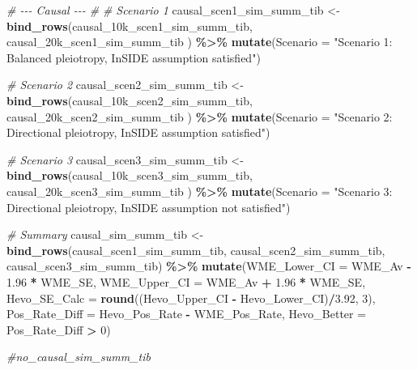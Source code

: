 \documentclass[
]{article}
\newenvironment{Shaded}{\begin{snugshade}}{\end{snugshade}}
\newcommand{\AttributeTok}[1]{\textcolor[rgb]{0.13,0.29,0.53}{#1}}
\newcommand{\CommentTok}[1]{\textcolor[rgb]{0.56,0.35,0.01}{\textit{#1}}}
\newcommand{\DecValTok}[1]{\textcolor[rgb]{0.00,0.00,0.81}{#1}}
\newcommand{\FloatTok}[1]{\textcolor[rgb]{0.00,0.00,0.81}{#1}}
\newcommand{\FunctionTok}[1]{\textcolor[rgb]{0.13,0.29,0.53}{\textbf{#1}}}
\newcommand{\NormalTok}[1]{#1}
\newcommand{\OtherTok}[1]{\textcolor[rgb]{0.56,0.35,0.01}{#1}}
\newcommand{\SpecialCharTok}[1]{\textcolor[rgb]{0.81,0.36,0.00}{\textbf{#1}}}
\newcommand{\StringTok}[1]{\textcolor[rgb]{0.31,0.60,0.02}{#1}}
\begin{document}
\begin{Shaded}
\begin{Highlighting}[]
\CommentTok{\# {-}{-}{-} Causal {-}{-}{-} \#}
\CommentTok{\# Scenario 1}
\NormalTok{causal\_scen1\_sim\_summ\_tib }\OtherTok{\textless{}{-}} \FunctionTok{bind\_rows}\NormalTok{(causal\_10k\_scen1\_sim\_summ\_tib,}
\NormalTok{                                       causal\_20k\_scen1\_sim\_summ\_tib}
\NormalTok{) }\SpecialCharTok{\%\textgreater{}\%} 
  \FunctionTok{mutate}\NormalTok{(}\AttributeTok{Scenario =} \StringTok{"Scenario 1: Balanced pleiotropy, InSIDE assumption satisfied"}\NormalTok{)}

\CommentTok{\# Scenario 2}
\NormalTok{causal\_scen2\_sim\_summ\_tib }\OtherTok{\textless{}{-}} \FunctionTok{bind\_rows}\NormalTok{(causal\_10k\_scen2\_sim\_summ\_tib,}
\NormalTok{                                       causal\_20k\_scen2\_sim\_summ\_tib}
\NormalTok{) }\SpecialCharTok{\%\textgreater{}\%} 
  \FunctionTok{mutate}\NormalTok{(}\AttributeTok{Scenario =} \StringTok{"Scenario 2: Directional pleiotropy, InSIDE assumption satisfied"}\NormalTok{)}

\CommentTok{\# Scenario 3}
\NormalTok{causal\_scen3\_sim\_summ\_tib }\OtherTok{\textless{}{-}} \FunctionTok{bind\_rows}\NormalTok{(causal\_10k\_scen3\_sim\_summ\_tib,}
\NormalTok{                                       causal\_20k\_scen3\_sim\_summ\_tib}
\NormalTok{) }\SpecialCharTok{\%\textgreater{}\%} 
  \FunctionTok{mutate}\NormalTok{(}\AttributeTok{Scenario =} \StringTok{"Scenario 3: Directional pleiotropy, InSIDE assumption not satisfied"}\NormalTok{)}


\CommentTok{\# Summary}
\NormalTok{causal\_sim\_summ\_tib }\OtherTok{\textless{}{-}} \FunctionTok{bind\_rows}\NormalTok{(causal\_scen1\_sim\_summ\_tib,}
\NormalTok{                                 causal\_scen2\_sim\_summ\_tib,}
\NormalTok{                                 causal\_scen3\_sim\_summ\_tib) }\SpecialCharTok{\%\textgreater{}\%} 
  \FunctionTok{mutate}\NormalTok{(}\AttributeTok{WME\_Lower\_CI =}\NormalTok{ WME\_Av }\SpecialCharTok{{-}} \FloatTok{1.96} \SpecialCharTok{*}\NormalTok{ WME\_SE,}
         \AttributeTok{WME\_Upper\_CI =}\NormalTok{ WME\_Av }\SpecialCharTok{+} \FloatTok{1.96} \SpecialCharTok{*}\NormalTok{ WME\_SE,}
         \AttributeTok{Hevo\_SE\_Calc =} \FunctionTok{round}\NormalTok{((Hevo\_Upper\_CI }\SpecialCharTok{{-}}\NormalTok{ Hevo\_Lower\_CI)}\SpecialCharTok{/}\FloatTok{3.92}\NormalTok{, }\DecValTok{3}\NormalTok{),}
         \AttributeTok{Pos\_Rate\_Diff =}\NormalTok{ Hevo\_Pos\_Rate }\SpecialCharTok{{-}}\NormalTok{ WME\_Pos\_Rate,}
         \AttributeTok{Hevo\_Better =}\NormalTok{ Pos\_Rate\_Diff }\SpecialCharTok{\textgreater{}} \DecValTok{0}\NormalTok{)}
  
\CommentTok{\#no\_causal\_sim\_summ\_tib}
\end{Highlighting}
\end{Shaded}
\end{document}
